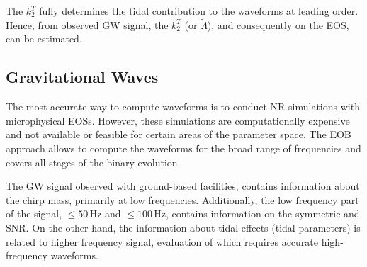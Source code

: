 %
The $k_2^T$ fully determines the tidal contribution to the waveforms at leading order. 
Hence, from observed \ac{GW} signal, the $k_2^T$ (or $\tilde{\Lambda}$), and 
consequently on the \ac{EOS}, can be estimated. 
%

\subsection{Gravitational Waves}

The most accurate way to compute waveforms is to conduct \ac{NR} simulations with microphysical 
\acp{EOS}. However, these simulations are computationally expensive and not available or feasible 
for certain areas of the parameter space. The \ac{EOB} approach allows to compute the waveforms 
for the broad range of frequencies and covers all stages of the binary evolution. 

The \ac{GW} signal observed with ground-based facilities, contains information 
about the chirp mass, 
primarily at low frequencies. Additionally, the low frequency part of the signal, 
${\leq}50\,$Hz and ${\leq}100\,$Hz, contains information on the symmetric \mr{} and \ac{SNR}.
On the other hand, the information about tidal effects (tidal parameters) is related to 
higher frequency signal, evaluation of which requires accurate high-frequency waveforms.


